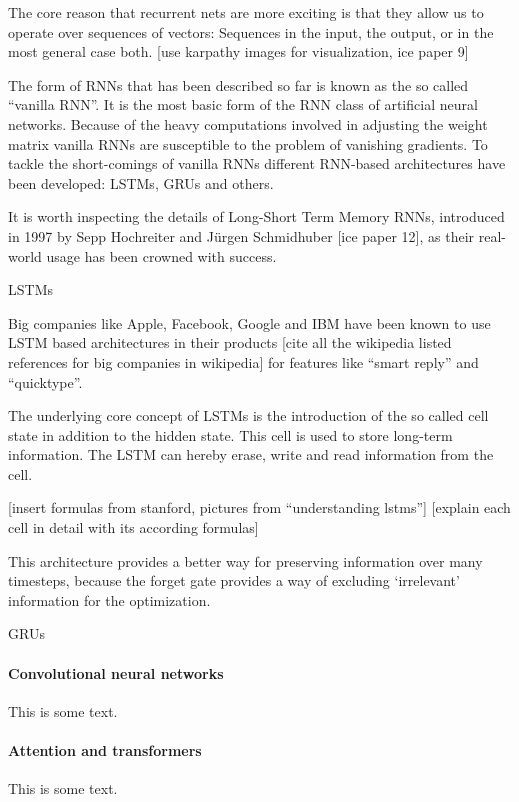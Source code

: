 The core reason that recurrent nets are more exciting is that they allow us to operate over sequences of vectors: Sequences in the input, the output, or in the most general case both.
[use karpathy images for visualization, ice paper 9]

The form of RNNs that has been described so far is known as the so called “vanilla RNN”. It is the most basic form of the RNN class of artificial neural networks. Because of the heavy computations involved in adjusting the weight matrix vanilla RNNs are susceptible to the problem of vanishing gradients. To tackle the short-comings of vanilla RNNs different RNN-based architectures have been developed: LSTMs, GRUs and others.

It is worth inspecting the details of Long-Short Term Memory RNNs, introduced in 1997 by Sepp Hochreiter and Jürgen Schmidhuber [ice paper 12], as their real-world usage has been crowned with success.

\bigskip

LSTMs

Big companies like Apple, Facebook, Google and IBM have been known to use LSTM based architectures in their products [cite all the wikipedia listed references for big companies in wikipedia] for features like “smart reply” and “quicktype”.

The underlying core concept of LSTMs is the introduction of the so called cell state in addition to the hidden state. This cell is used to store long-term information. The LSTM can hereby erase, write and read information from the cell.

[insert formulas from stanford, pictures from “understanding lstms”]
[explain each cell in detail with its according formulas]

This architecture provides a better way for preserving information over many timesteps, because the forget gate provides a way of excluding ‘irrelevant’ information for the optimization.

\bigskip

GRUs


\paragraph{Convolutional neural networks}
This is some text.

\paragraph{Attention and transformers}
This is some text.